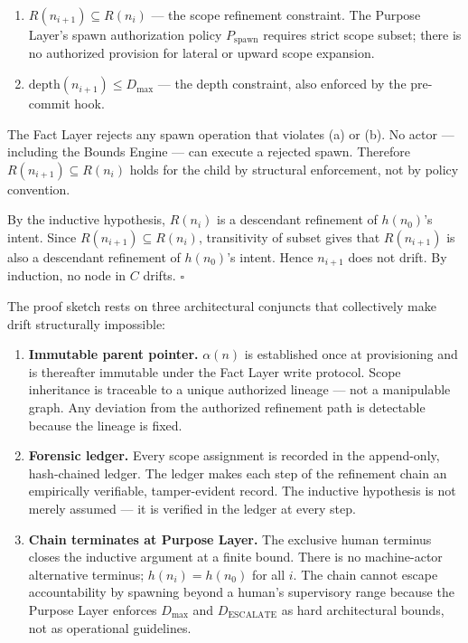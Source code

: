 \begin{enumerate}
    \item[(a)] $R(n_{i+1}) \subseteq R(n_i)$ --- the scope refinement constraint. The Purpose Layer's spawn authorization policy $P_{\mathrm{spawn}}$ requires strict scope subset; there is no authorized provision for lateral or upward scope expansion.
    \item[(b)] $\mathrm{depth}(n_{i+1}) \leq D_{\mathrm{max}}$ --- the depth constraint, also enforced by the pre-commit hook.
\end{enumerate}

The Fact Layer rejects any spawn operation that violates (a) or (b). No actor --- including the Bounds Engine --- can execute a rejected spawn. Therefore $R(n_{i+1}) \subseteq R(n_i)$ holds for the child by structural enforcement, not by policy convention.

By the inductive hypothesis, $R(n_i)$ is a descendant refinement of $h(n_0)$'s intent. Since $R(n_{i+1}) \subseteq R(n_i)$, transitivity of subset gives that $R(n_{i+1})$ is also a descendant refinement of $h(n_0)$'s intent. Hence $n_{i+1}$ does not drift. By induction, no node in $C$ drifts. $\square$

\medskip
The proof sketch rests on three architectural conjuncts that collectively make drift structurally impossible:

\begin{enumerate}
    \item[(1)] \textbf{Immutable parent pointer.} $\alpha(n)$ is established once at provisioning and is thereafter immutable under the Fact Layer write protocol. Scope inheritance is traceable to a unique authorized lineage --- not a manipulable graph. Any deviation from the authorized refinement path is detectable because the lineage is fixed.
    \item[(2)] \textbf{Forensic ledger.} Every scope assignment is recorded in the append-only, hash-chained ledger. The ledger makes each step of the refinement chain an empirically verifiable, tamper-evident record. The inductive hypothesis is not merely assumed --- it is verified in the ledger at every step.
    \item[(3)] \textbf{Chain terminates at Purpose Layer.} The exclusive human terminus closes the inductive argument at a finite bound. There is no machine-actor alternative terminus; $h(n_i) = h(n_0)$ for all $i$. The chain cannot escape accountability by spawning beyond a human's supervisory range because the Purpose Layer enforces $D_{\mathrm{max}}$ and $D_{\mathrm{ESCALATE}}$ as hard architectural bounds, not as operational guidelines.
\end{enumerate}


